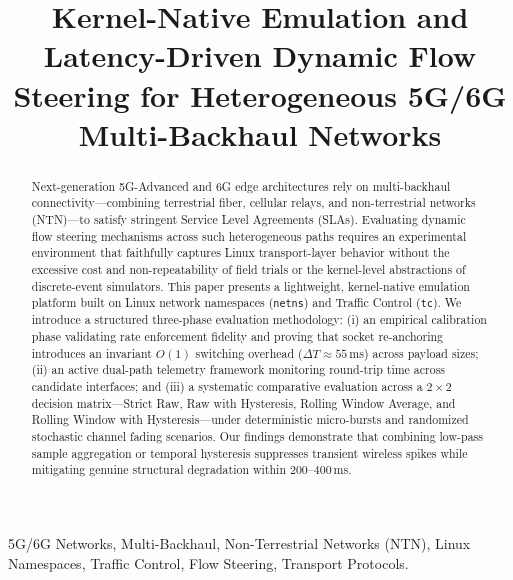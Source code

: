 \documentclass[conference]{IEEEtran}
\begin{document}
\title{Kernel-Native Emulation and Latency-Driven Dynamic Flow Steering for Heterogeneous 5G/6G Multi-Backhaul Networks}

\author{
}

\maketitle

\begin{abstract}
Next-generation 5G-Advanced and 6G edge architectures rely on multi-backhaul connectivity---combining terrestrial fiber, cellular relays, and non-terrestrial networks (NTN)---to satisfy stringent Service Level Agreements (SLAs). Evaluating dynamic flow steering mechanisms across such heterogeneous paths requires an experimental environment that faithfully captures Linux transport-layer behavior without the excessive cost and non-repeatability of field trials or the kernel-level abstractions of discrete-event simulators. This paper presents a lightweight, kernel-native emulation platform built on Linux network namespaces (\texttt{netns}) and Traffic Control (\texttt{tc}). We introduce a structured three-phase evaluation methodology: (i) an empirical calibration phase validating rate enforcement fidelity and proving that socket re-anchoring introduces an invariant $O(1)$ switching overhead ($\Delta T \approx 55$\,ms) across payload sizes; (ii) an active dual-path telemetry framework monitoring round-trip time across candidate interfaces; and (iii) a systematic comparative evaluation across a $2 \times 2$ decision matrix---Strict Raw, Raw with Hysteresis, Rolling Window Average, and Rolling Window with Hysteresis---under deterministic micro-bursts and randomized stochastic channel fading scenarios. Our findings demonstrate that combining low-pass sample aggregation or temporal hysteresis suppresses transient wireless spikes while mitigating genuine structural degradation within $200$--$400$\,ms.
\end{abstract}

\begin{IEEEkeywords}
5G/6G Networks, Multi-Backhaul, Non-Terrestrial Networks (NTN), Linux Namespaces, Traffic Control, Flow Steering, Transport Protocols.
\end{IEEEkeywords}
\end{document}
